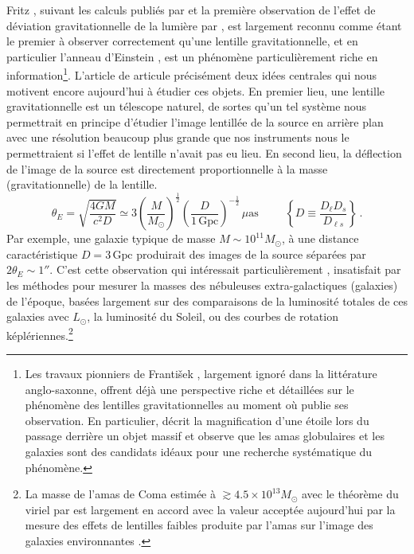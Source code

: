 Fritz \citet{Zwicky1937}, suivant les calculs publiés par \citet{Einstein1936} et la première observation 
de l'effet de déviation gravitationnelle de la lumière par \citet{Eddington1919}, 
est largement reconnu comme étant le premier à observer correctement qu'une lentille gravitationnelle, et en particulier 
l'anneau d'Einstein \citep{Chwolson1924},
est un phénomène particulièrement riche en information\footnote{ 
        Les travaux pionniers de Franti\v{s}ek \citet{Link1936,Link1937}, largement ignoré dans la littérature anglo-saxonne, %
        offrent déjà une perspective riche et détaillées sur le phénomène des lentilles gravitationnelles au moment où \citet{Zwicky1937} publie 
        ses observation. 
        En particulier, \citet{Link1936} décrit la magnification d'une étoile lors du passage derrière un objet massif et 
        observe que les amas globulaires et les galaxies sont des candidats idéaux pour une recherche systématique du 
        phénomène.
        }. 
L'article de \citet{Zwicky1937} articule précisément deux idées centrales qui nous motivent encore aujourd'hui à 
étudier ces objets. En premier lieu, une lentille gravitationnelle est un télescope naturel, de sortes qu'un tel 
système nous permettrait en principe d'étudier l'image lentillée de la source en arrière plan avec une résolution beaucoup plus grande que nos instruments 
nous le permettraient si l'effet de lentille n'avait pas eu lieu. En second lieu, la déflection de l'image de la source 
est directement proportionnelle à la masse (gravitationnelle) de la lentille. 
\begin{equation}\label{eq:Taille Lentille}
        \theta_E = \sqrt{\frac{4 G M}{c^{2} D}} \simeq 3\left( \frac{M}{M_{\odot}} \right)^{\frac{1}{2}} \left( \frac{D}{1\, \mathrm{Gpc}} \right)^{-\frac{1}{2}}\, \mu\mathrm{as} \hspace{1cm} \left\{D \equiv \frac{D_{\ell} D_s}{D_{\ell s}}\right\}\, .
\end{equation}
Par exemple, une galaxie typique de masse $M\sim 10^{11} M_{\odot}$, à une distance caractéristique $D= 3 \, \mathrm{Gpc}$ produirait des 
images de la source séparées par $2 \theta_E \sim 1''$. C'est cette observation qui intéressait particulièrement 
\citet{Zwicky1937b}, insatisfait par les méthodes pour mesurer la masses des nébuleuses extra-galactiques (galaxies) 
de l'époque, basées largement sur des comparaisons de la luminosité totales de ces galaxies avec $L_\odot$, la luminosité du Soleil, 
ou des courbes de rotation képlériennes.\footnote{
La masse de l'amas de Coma estimée à $\gtrsim 4.5\times  10^{13}M_\odot$ avec le théorème du viriel par \citet{Zwicky1937b} est 
largement en accord avec la valeur acceptée aujourd'hui par la mesure des effets de lentilles faibles produite par l'amas 
sur l'image des galaxies environnantes \citep[$5^{+4.3}_{-2.1} \times 10^{14}\, h^{-1}_{70}\,M_\odot$,][]{Gavazzi2009}.
} 
